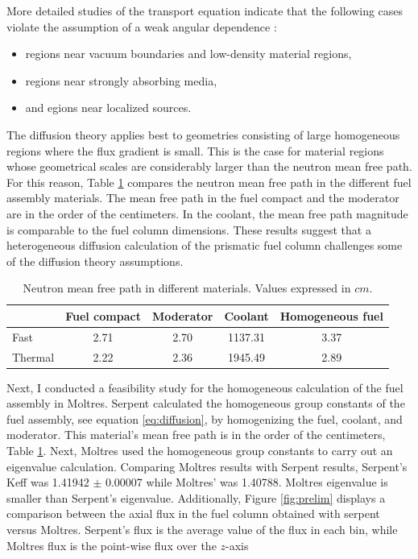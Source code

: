 More detailed studies of the transport equation indicate that the following cases violate the assumption of a weak angular dependence \cite{duderstadt_nuclear_1976}:
\begin{itemize}
    \item regions near vacuum boundaries and low-density material regions,
    \item regions near strongly absorbing media,
    \item and egions near localized sources.
\end{itemize}

The diffusion theory applies best to geometries consisting of large homogeneous regions where the flux gradient is small.
This is the case for material regions whose geometrical scales are considerably larger than the neutron mean free path.
For this reason, Table \ref{tab:mfp} compares the neutron mean free path in the different fuel assembly materials.
The mean free path in the fuel compact and the moderator are in the order of the centimeters.
In the coolant, the mean free path magnitude is comparable to the fuel column dimensions.
These results suggest that a heterogeneous diffusion calculation of the prismatic fuel column challenges some of the diffusion theory assumptions.

\begin{table}[htbp!]
  \centering
  \caption{Neutron mean free path in different materials. Values expressed in $cm$.}
  \begin{tabular}{l|cccc}
  \toprule
              & Fuel compact  & Moderator  & Coolant  & Homogeneous fuel \\
  \midrule
  Fast  		& 2.71 & 2.70 & 1137.31 & 3.37 \\
  Thermal		& 2.22 & 2.36 & 1945.49 & 2.89 \\
  \bottomrule
  \end{tabular}
  \label{tab:mfp}
\end{table}

Next, I conducted a feasibility study for the homogeneous calculation of the fuel assembly in Moltres.
Serpent calculated the homogeneous group constants of the fuel assembly, see equation \ref{eq:diffusion}, by homogenizing the fuel, coolant, and moderator.
This material's mean free path is in the order of the centimeters, Table \ref{tab:mfp}.
Next, Moltres used the homogeneous group constants to carry out an eigenvalue calculation.
Comparing Moltres results with Serpent results, Serpent's \gls{Keff} was 1.41942 $\pm$ 0.00007 while Moltres' was 1.40788.
Moltres eigenvalue is smaller than Serpent's eigenvalue.
Additionally, Figure \ref{fig:prelim} displays a comparison between the axial flux in the fuel column obtained with serpent versus Moltres.
Serpent's flux is the average value of the flux in each bin, while Moltres flux is the point-wise flux over the $z$-axis

